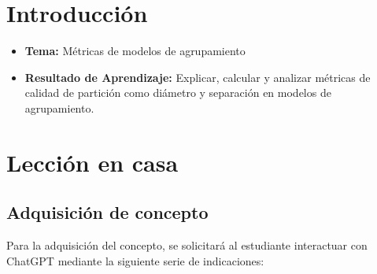 \documentclass[a4,11pt]{aleph-notas}
\begin{document}
\encabezado

\vspace*{-10mm}
\section*{Introducción}

\begin{itemize}
    \item \textbf{Tema:} Métricas de modelos de agrupamiento
    \item \textbf{Resultado de Aprendizaje:} Explicar, calcular y analizar métricas de calidad de partición como diámetro y separación en modelos de agrupamiento.
\end{itemize}

\section{Lección en casa}

\subsection{Adquisición de concepto}

Para la adquisición del concepto, se solicitará al estudiante interactuar con ChatGPT mediante la siguiente serie de indicaciones:
\end{document}
